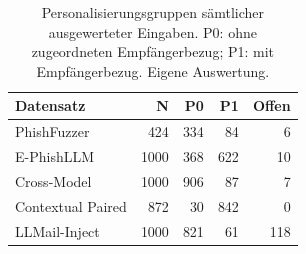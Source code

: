 \begin{table}[htbp]
\centering\small
\caption{Personalisierungsgruppen sämtlicher ausgewerteter Eingaben. P0: ohne zugeordneten Empfängerbezug; P1: mit Empfängerbezug. Eigene Auswertung.}
\label{tab:personalisierung-vorschlaege}
\begin{tabular}{lrrrr}
\toprule
Datensatz & N & P0 & P1 & Offen \\
\midrule
PhishFuzzer & 424 & 334 & 84 & 6 \\
E-PhishLLM & 1000 & 368 & 622 & 10 \\
Cross-Model & 1000 & 906 & 87 & 7 \\
Contextual Paired & 872 & 30 & 842 & 0 \\
LLMail-Inject & 1000 & 821 & 61 & 118 \\
\bottomrule
\end{tabular}
\end{table}
